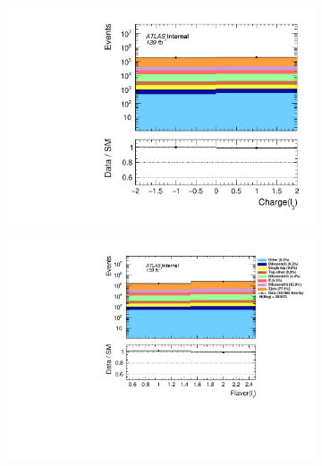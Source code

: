 \begin{figure}[H]
{\begin{subfigure}{.405\textwidth}
        \includegraphics[width=\textwidth]{Figures/FeaturesHistograms/MCvsData/lep3_Charge.pdf}
        \caption{}
        \label{fig:lep3_Charge}
    \end{subfigure}
    \hfill
    \begin{subfigure}{.525\textwidth}
        \includegraphics[width=\textwidth]{Figures/FeaturesHistograms/MCvsData/lep1_Flavor.pdf}
        \caption{}
        \label{fig:lep1_Flavor}
    \end{subfigure}
    }
\end{figure}
